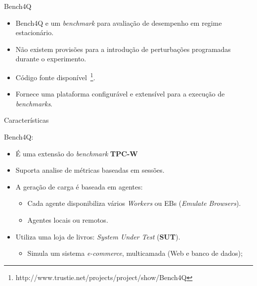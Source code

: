 \begin{frame}{Bench4Q}

\begin{itemize}
\item Bench4Q e um \textit{benchmark} para avaliação de desempenho em regime estacionário.

\item Não existem provisões para a introdução de perturbações programadas durante o experimento.

\item Código fonte disponível~\footnote{http://www.trustie.net/projects/project/show/Bench4Q}.


\item Fornece uma plataforma configurável e extensível para a execução de \textit{benchmarks}.
\end{itemize}


\end{frame}

\begin{frame}{Características}

Bench4Q:
\begin{itemize}
	\item É uma extensão do \textit{benchmark} \textbf{TPC-W} %
	\item Suporta analise de métricas baseadas em sessões.
	\item A geração de carga é baseada em agentes:
	\begin{itemize}
		\item Cada agente disponibiliza vários \textit{Workers} ou EBs (\textit{Emulate Browsers}).
		\item Agentes locais ou remotos.
	\end{itemize}
	\item Utiliza uma loja de livros: \textit{System Under Test} (\textbf{SUT}).
	\begin{itemize}
		\item Simula um sistema \textit{e-commerce}, multicamada (Web e banco de dados);
	\end{itemize}
\end{itemize}

\end{frame}

